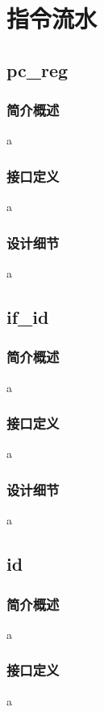 \chapter{指令流水}

\section{pc\_reg}

    \subsection{简介概述}
    a

    \subsection{接口定义}
    a

    \subsection{设计细节}
    a

\section{if\_id}

    \subsection{简介概述}
    a

    \subsection{接口定义}
    a

    \subsection{设计细节}
    a

\section{id}

    \subsection{简介概述}
    a

    \subsection{接口定义}
    a

